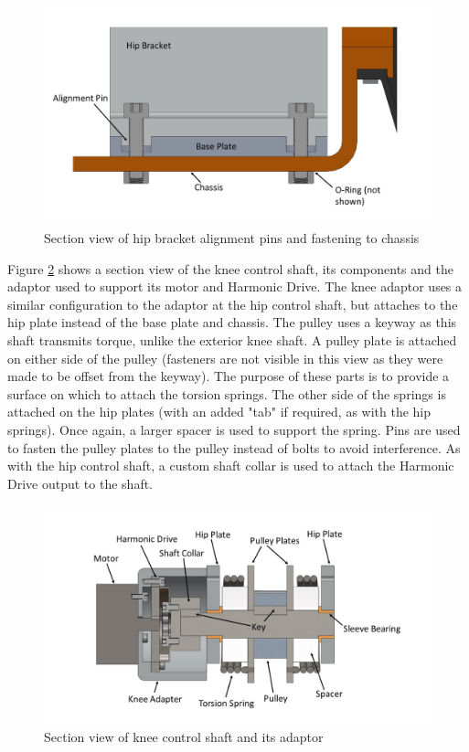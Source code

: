 \begin{figure}
    \centering
    \includegraphics[width=\textwidth]{2_ProposedDesign/img/AlignmentPinsZoomedInA.jpg}
    \caption{Section view of hip bracket alignment pins and fastening to chassis}
    \label{fig:hip_bracket}
\end{figure}

Figure \ref{fig:shaft_kneehip} shows a section view of the knee control shaft, its components and the adaptor used to support its motor and Harmonic Drive. The knee adaptor uses a similar configuration to the adaptor at the hip control shaft, but attaches to the hip plate instead of the base plate and chassis. The pulley uses a keyway as this shaft transmits torque, unlike the exterior knee shaft. A pulley plate is attached on either side of the pulley (fasteners are not visible in this view as they were made to be offset from the keyway). The purpose of these parts is to provide a surface on which to attach the torsion springs. The other side of the springs is attached on the hip plates (with an added "tab" if required, as with the hip springs). Once again, a larger spacer is used to support the spring. Pins are used to fasten the pulley plates to the pulley instead of bolts to avoid interference. As with the hip control shaft, a custom shaft collar is used to attach the Harmonic Drive output to the shaft.

\begin{figure}
    \centering
    \includegraphics[width=\textwidth]{2_ProposedDesign/img/SectionHipKneeShaftA.jpg}
    \caption{Section view of knee control shaft and its adaptor}
    \label{fig:shaft_kneehip} 
\end{figure}



